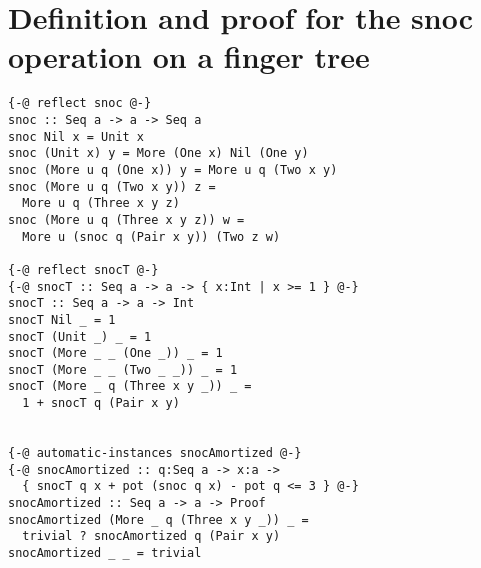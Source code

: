 \documentclass[sigplan,screen]{acmart}
\begin{document}
\section{Definition and proof for the snoc operation on a finger tree}

\begin{lstlisting}
{-@ reflect snoc @-}
snoc :: Seq a -> a -> Seq a
snoc Nil x = Unit x
snoc (Unit x) y = More (One x) Nil (One y)
snoc (More u q (One x)) y = More u q (Two x y)
snoc (More u q (Two x y)) z =
  More u q (Three x y z)
snoc (More u q (Three x y z)) w =
  More u (snoc q (Pair x y)) (Two z w)

{-@ reflect snocT @-}
{-@ snocT :: Seq a -> a -> { x:Int | x >= 1 } @-}
snocT :: Seq a -> a -> Int
snocT Nil _ = 1
snocT (Unit _) _ = 1
snocT (More _ _ (One _)) _ = 1
snocT (More _ _ (Two _ _)) _ = 1
snocT (More _ q (Three x y _)) _ =
  1 + snocT q (Pair x y)


{-@ automatic-instances snocAmortized @-}
{-@ snocAmortized :: q:Seq a -> x:a ->
  { snocT q x + pot (snoc q x) - pot q <= 3 } @-}
snocAmortized :: Seq a -> a -> Proof
snocAmortized (More _ q (Three x y _)) _ =
  trivial ? snocAmortized q (Pair x y)
snocAmortized _ _ = trivial

\end{lstlisting}
\end{document}
